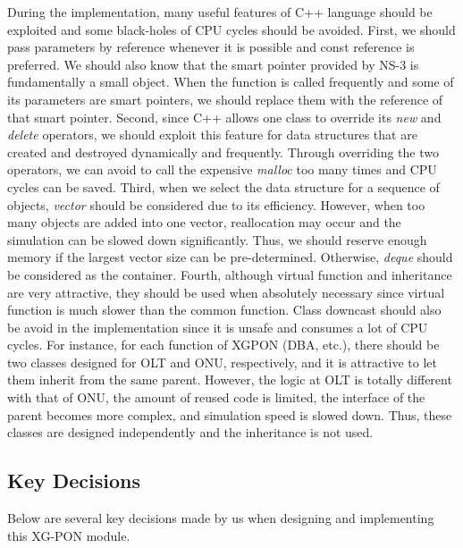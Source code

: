 \begin{itemize}
During the implementation, many useful features of C++ language
should be exploited and some black-holes of CPU cycles should be
avoided. First, we should pass parameters by reference whenever it
is possible and const reference is preferred. We should also know
that the smart pointer provided by NS-3 is fundamentally a small
object. When the function is called frequently and some of its
parameters are smart pointers, we should replace them with the
reference of that smart pointer. Second, since C++ allows one
class to override its \emph{new} and \emph{delete} operators, we
should exploit this feature for data structures that are created
and destroyed dynamically and frequently. Through overriding the
two operators, we can avoid to call the expensive \emph{malloc}
too many times and CPU cycles can be saved. Third, when we select
the data structure for a sequence of objects, \emph{vector} should
be considered due to its efficiency. However, when too many
objects are added into one vector, reallocation may occur and the
simulation can be slowed down significantly. Thus, we should
reserve enough memory if the largest vector size can be
pre-determined. Otherwise, \emph{deque} should be considered as
the container. Fourth, although virtual function and inheritance 
are very attractive, they should be used when absolutely necessary
since virtual function is much slower than the common function. 
Class downcast should also be avoid in the implementation since
it is unsafe and consumes a lot of CPU cycles. For instance, for 
each function of XGPON (DBA, etc.), there should be two classes 
designed for OLT and ONU, respectively, and it is attractive to
let them inherit from the same parent. However, the logic at OLT
is totally different with that of ONU, the amount of reused code 
is limited, the interface of the parent becomes more complex,
and simulation speed is slowed down. Thus, these classes are 
designed independently and the inheritance is not used.




\end{itemize}


\subsection{Key Decisions}

Below are several key decisions made by us when designing and
implementing this XG-PON module.

